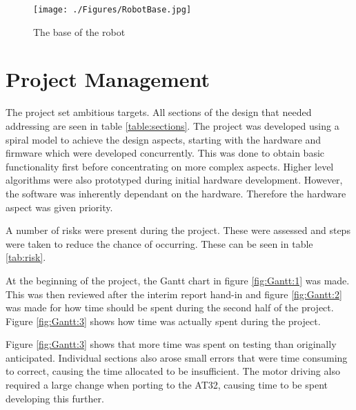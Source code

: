 \begin{figure}
\centering
\texttt{[image: ./Figures/RobotBase.jpg]}
\caption{The base of the robot}
\label{fig:RobotBase}
\end{figure}

\section{Project Management}


The project set ambitious targets. All sections of the design that needed addressing are seen in table \ref{table:sections}. The project was developed using a spiral model to achieve the design aspects, starting with the hardware and firmware which were developed concurrently. This was done to obtain basic functionality first before concentrating on more complex aspects. Higher level algorithms were also prototyped during initial hardware development. However, the software was inherently dependant on the hardware. Therefore the hardware aspect was given priority. 

A number of risks were present during the project. These were assessed and steps were taken to reduce the chance of occurring. These can be seen in table \ref{tab:risk}. 

At the beginning of the project, the Gantt chart in figure \ref{fig:Gantt:1} was made. This was then reviewed after the interim report hand-in and figure \ref{fig:Gantt:2} was made for how time should be spent during the second half of the project. Figure \ref{fig:Gantt:3} shows how time was actually spent during the project. 

Figure \ref{fig:Gantt:3} shows that more time was spent on testing than originally anticipated. Individual sections also arose small errors that were time consuming to correct, causing the time allocated to be insufficient. The motor driving also required a large change when porting to the AT32, causing time to be spent developing this further. 


